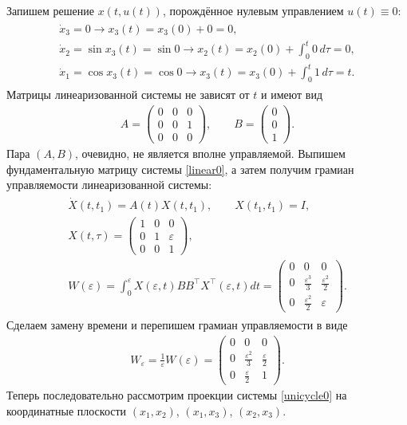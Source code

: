 \documentclass[../main.tex]{subfiles}
\begin{document}
 Запишем решение $ x(t,u(t)) $, порождённое нулевым управлением $ u(t) \equiv 0 $:
 \begin{gather*}
 \begin{gathered}
 \dot{x}_3 = 0 \longrightarrow x_3(t) = x_3(0) + 0 = 0, \\
 \dot{x}_2 = \sin x_3(t) = \sin 0 \longrightarrow x_2(t) = x_2(0) + \int_0^t 0 \, d\tau = 0,\\
 \dot{x}_1 = \cos x_3(t) = \cos 0 \longrightarrow x_3(t) = x_3(0) + \int_0^t 1 \, d\tau = t.
 \end{gathered}
 \end{gather*}
 Матрицы линеаризованной системы не зависят от $ t $ и имеют вид
 \begin{gather}\label{linear0}
 A = \begin{pmatrix}
 0 & 0 & 0 \\ 
 0 & 0 & 1 \\ 
 0 & 0 & 0
 \end{pmatrix}, \qquad B = \begin{pmatrix}
 0 \\ 
 0 \\ 
 1
 \end{pmatrix}.
 \end{gather}
 Пара $ (A,B) $, очевидно, не является вполне управляемой.
 Выпишем фундаментальную матрицу системы \eqref{linear0}, а затем получим грамиан управляемости линеаризованной системы:
 \begin{gather*}
 \begin{gathered}
 \dot{X}(t,t_1) = A(t) X(t,t_1), \qquad X(t_1,t_1) = I, \\
 X(t,\tau) = \begin{pmatrix}
 1 & 0 & 0 \\ 
 0 & 1 & \varepsilon \\ 
 0 & 0 & 1
 \end{pmatrix}, \\
 W(\varepsilon) = \int_0^{\varepsilon}X(\varepsilon,t) B B^{\top} X^{\top}(\varepsilon,t)dt 
 =\begin{pmatrix}
 0 & 0 & 0 \\
 0 & \frac{\varepsilon^3}{3} & \frac{\varepsilon^2}{2} \\
 0 & \frac{\varepsilon^2}{2} & \varepsilon
 \end{pmatrix}.
 \end{gathered}
 \end{gather*}
 Сделаем замену времени и перепишем грамиан управляемости в виде
 \begin{gather*}
 W_{\varepsilon} = \frac{1}{\varepsilon}W(\varepsilon) =\begin{pmatrix}
 0 & 0 & 0 \\
 0 & \frac{\varepsilon^2}{3} & \frac{\varepsilon}{2} \\
 0 & \frac{\varepsilon}{2} & 1
 \end{pmatrix}.
 \end{gather*} 
 Теперь последовательно рассмотрим проекции системы \eqref{unicycle0} на координатные плоскости $ (x_1, x_2) $, $ (x_1, x_3) $, $ (x_2, x_3) $. \\
 
\end{document}

